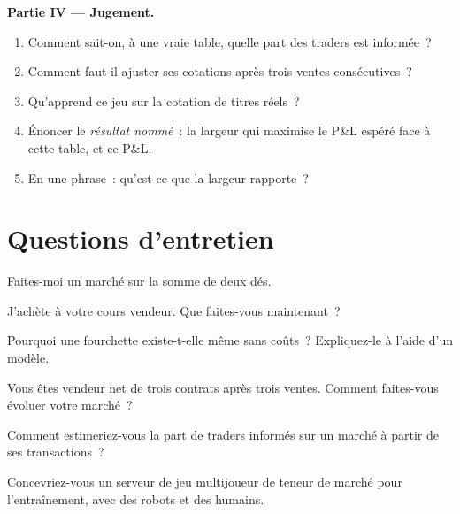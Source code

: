 \begin{problem}
\medskip\noindent\textbf{Partie IV --- Jugement.}
\begin{enumerate}[resume]
\item Comment sait-on, à une vraie table, quelle part des traders est informée~?
\item Comment faut-il ajuster ses cotations après trois ventes consécutives~?
\item Qu'apprend ce jeu sur la cotation de titres réels~?
\item Énoncer le \emph{résultat nommé}~: la largeur qui maximise le P\&L espéré face à cette
table, et ce P\&L.
\item En une phrase~: qu'est-ce que la largeur rapporte~?
\end{enumerate}
\end{problem}

\section{Questions d'entretien}

\begin{interviewq}\label{iq:m2:market-making-games:1}
Faites-moi un marché sur la somme de deux dés.
\end{interviewq}

\begin{interviewq}\label{iq:m2:market-making-games:2}
J'achète à votre cours vendeur. Que faites-vous maintenant~?
\end{interviewq}

\begin{interviewq}\label{iq:m2:market-making-games:3}
Pourquoi une fourchette existe-t-elle même sans coûts~? Expliquez-le à l'aide d'un modèle.
\end{interviewq}

\begin{interviewq}\label{iq:m2:market-making-games:4}
Vous êtes vendeur net de trois contrats après trois ventes. Comment faites-vous évoluer votre marché~?
\end{interviewq}

\begin{interviewq}\label{iq:m2:market-making-games:5}
Comment estimeriez-vous la part de traders informés sur un marché à partir de ses transactions~?
\end{interviewq}

\begin{interviewq}\label{iq:m2:market-making-games:6}
Concevriez-vous un serveur de jeu multijoueur de teneur de marché pour l'entraînement, avec des robots et des humains.
\end{interviewq}
